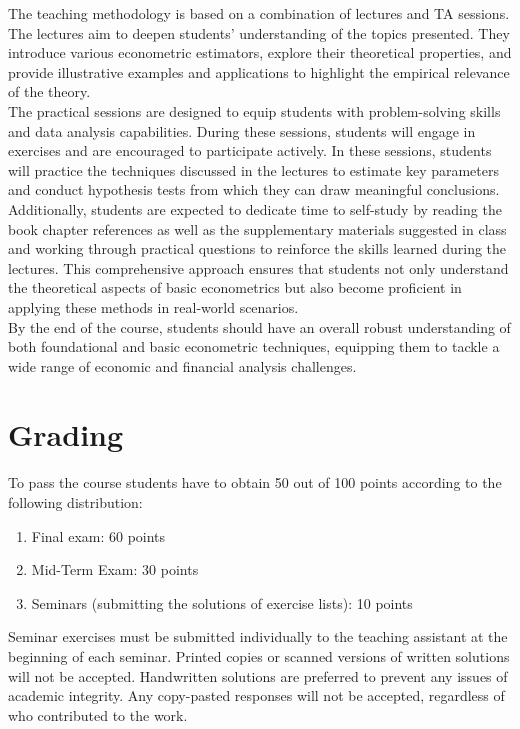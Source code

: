 \documentclass[12pt]{article}
\begin{document}
The teaching methodology is based on a combination of lectures and TA sessions. The lectures aim to deepen students' understanding of the topics presented. They introduce various econometric estimators, explore their theoretical properties, and provide illustrative examples and applications to highlight the empirical relevance of the theory.\\

The practical sessions are designed to equip students with problem-solving skills and data analysis capabilities. During these sessions, students will engage in exercises and are encouraged to participate actively. In these sessions, students will practice the techniques discussed in the lectures to estimate key parameters and conduct hypothesis tests from which they can draw meaningful conclusions.\\

Additionally, students are expected to dedicate time to self-study by reading the book chapter references as well as the supplementary materials suggested in class and working through practical questions to reinforce the skills learned during the lectures. This comprehensive approach ensures that students not only understand the theoretical aspects of basic econometrics but also become proficient in applying these methods in real-world scenarios.\\

By the end of the course, students should have an overall robust understanding of both foundational and basic econometric techniques, equipping them to tackle a wide range of economic and financial analysis challenges.


\section*{Grading}
To pass the course students have to obtain 50 out of 100 points according to the following distribution:
\begin{enumerate}
    \item Final exam: 60 points
    \item Mid-Term Exam: 30 points
    \item Seminars (submitting the solutions of exercise lists): 10 points
\end{enumerate}

Seminar exercises must be submitted individually to the teaching assistant at the beginning of each seminar. Printed copies or scanned versions of written solutions will not be accepted. Handwritten solutions are preferred to prevent any issues of academic integrity. Any copy-pasted responses will not be accepted, regardless of who contributed to the work.\\
\end{document}
